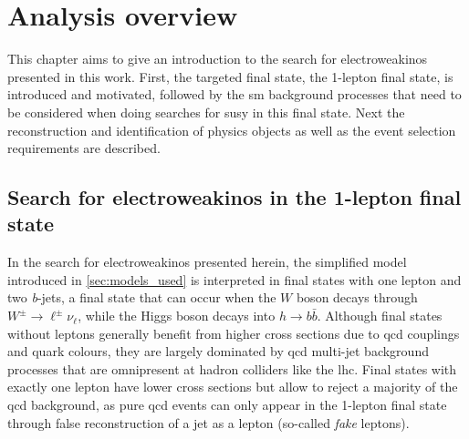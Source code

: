 
\chapter{Analysis overview}\label{ch:1lepton}

\ifpdf
    \graphicspath{{chapter-analysis/Figs/Raster/}{chapter-analysis/Figs/PDF/}{chapter-analysis/Figs/}}
\else
    \graphicspath{{chapter-analysis/Figs/Vector/}{chapter-analysis/Figs/}}
\fi


This chapter aims to give an introduction to the search for electroweakinos presented in this work. First, the targeted final state, the 1-lepton final state, is introduced and motivated, followed by the \gls{sm} background processes that need to be considered when doing searches for \gls{susy} in this final state. Next the reconstruction and identification of physics objects as well as the event selection requirements are described.

\section{Search for electroweakinos in the 1-lepton final state}

In the search for electroweakinos presented herein, the simplified model introduced in \cref{sec:models_used} is interpreted in final states with one lepton and two \textit{b}-jets, a final state that can occur when the $W$ boson decays through $W^\pm\rightarrow\ell^\pm\nu_\ell$, while the Higgs boson decays into $h\rightarrow b\bar{b}$. Although final states without leptons generally benefit from higher cross sections due to \gls{qcd} couplings and quark colours, they are largely dominated by \gls{qcd} multi-jet background processes that are omnipresent at hadron colliders like the \gls{lhc}. Final states with exactly one lepton have lower cross sections but allow to reject a majority of the \gls{qcd} background, as pure \gls{qcd} events can only appear in the 1-lepton final state through false reconstruction of a jet as a lepton (so-called \textit{fake} leptons). 

